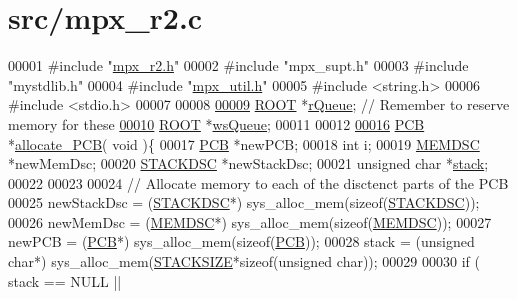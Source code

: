 \hypertarget{mpx__r2_8c_source}{
\section{src/mpx\_\-r2.c}
}

\begin{DoxyCode}
00001 \textcolor{preprocessor}{#include "\hyperlink{mpx__r2_8h}{mpx_r2.h}"}
00002 \textcolor{preprocessor}{#include "mpx\_supt.h"}
00003 \textcolor{preprocessor}{#include "mystdlib.h"}
00004 \textcolor{preprocessor}{#include "\hyperlink{mpx__util_8h}{mpx_util.h}"}
00005 \textcolor{preprocessor}{#include <string.h>}
00006 \textcolor{preprocessor}{#include <stdio.h>}
00007 
00008 
\hypertarget{mpx__r2_8c_source_l00009}{}\hyperlink{mpx__r2_8c_afe54c168944e64a28d76b6e4d3abb391}{00009} \hyperlink{structroot}{ROOT} *\hyperlink{mpx__r2_8c_afe54c168944e64a28d76b6e4d3abb391}{rQueue}; \textcolor{comment}{// Remember to reserve memory for these}
\hypertarget{mpx__r2_8c_source_l00010}{}\hyperlink{mpx__r2_8c_ac4950750e25f86d7ee69d6bcca87ef5f}{00010} \hyperlink{structroot}{ROOT} *\hyperlink{mpx__r2_8c_ac4950750e25f86d7ee69d6bcca87ef5f}{wsQueue};
00011 
00012 
\hypertarget{mpx__r2_8c_source_l00016}{}\hyperlink{mpx__r2_8c_a58a8a1ea0a96b9ecf0be29179a5a0a1e}{00016} \hyperlink{structprocess}{PCB} *\hyperlink{mpx__r2_8c_a58a8a1ea0a96b9ecf0be29179a5a0a1e}{allocate_PCB}( \textcolor{keywordtype}{void} )\{
00017         \hyperlink{structprocess}{PCB} *newPCB; 
00018         \textcolor{keywordtype}{int} i;
00019         \hyperlink{structmem}{MEMDSC} *newMemDsc;
00020         \hyperlink{structstack}{STACKDSC} *newStackDsc;
00021         \textcolor{keywordtype}{unsigned} \textcolor{keywordtype}{char} *\hyperlink{structstack}{stack}; 
00022         
00023         
00024         \textcolor{comment}{// Allocate memory to each of the disctenct parts of the PCB}
00025         newStackDsc = (\hyperlink{structstack}{STACKDSC}*) sys\_alloc\_mem(\textcolor{keyword}{sizeof}(\hyperlink{structstack}{STACKDSC}));
00026         newMemDsc = (\hyperlink{structmem}{MEMDSC}*) sys\_alloc\_mem(\textcolor{keyword}{sizeof}(\hyperlink{structmem}{MEMDSC}));
00027         newPCB = (\hyperlink{structprocess}{PCB}*) sys\_alloc\_mem(\textcolor{keyword}{sizeof}(\hyperlink{structprocess}{PCB}));
00028         stack = (\textcolor{keywordtype}{unsigned} \textcolor{keywordtype}{char}*) sys\_alloc\_mem(\hyperlink{mpx__r2_8h_a21d9543c516fffee84a7963224271f95}{STACKSIZE}*\textcolor{keyword}{sizeof}(\textcolor{keywordtype}{unsigned} \textcolor{keywordtype}{char}));
00029         
00030         \textcolor{keywordflow}{if} ( stack == NULL || 

\end{DoxyCode}
